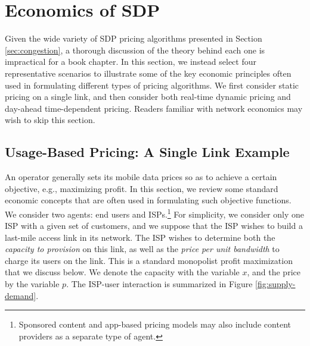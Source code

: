 \section{Economics of SDP}\label{sec:econ}


Given the wide variety of SDP pricing algorithms presented in Section \ref{sec:congestion}, a thorough discussion of the theory behind each one is impractical for a book chapter. In this section, we instead select four representative scenarios to illustrate some of the key economic principles often used in formulating different types of pricing algorithms. We first consider static pricing on a single link, and then consider both real-time dynamic pricing and day-ahead time-dependent pricing. Readers familiar with network economics may wish to skip this section.

\subsection{Usage-Based Pricing: A Single Link Example}\label{sec:single}

An operator generally sets its mobile data prices so as to achieve a certain objective, e.g., maximizing profit. In this section, we review some standard economic concepts that are often used in formulating such objective functions. We consider two agents: end users and ISPs.\footnote{Sponsored content and app-based pricing models may also include content providers as a separate type of agent.} For simplicity, we consider only one ISP with a given set of customers, and we suppose that the ISP wishes to build a last-mile access link in its network. The ISP wishes to determine both the \emph{capacity to provision} on this link, as well as the \emph{price per unit bandwidth} to charge its users on the link. This is a standard monopolist profit maximization that we discuss below. We denote the capacity with the variable $x$, and the price by the variable $p$. The ISP-user interaction is summarized in Figure \ref{fig:supply-demand}.

